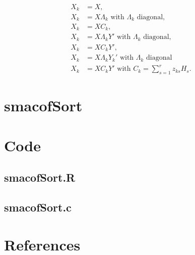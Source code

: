 \documentclass[
  12pt,
]{article}
\newenvironment{Shaded}{\begin{snugshade}}{\end{snugshade}}
\begin{document}
\begin{align}
X_k&=X,\\
X_k&=X\Lambda_k \text{ with }\Lambda_k\text{ diagonal},\\
X_k&=XC_k,\\
X_k&=X\Lambda_k Y' \text{ with }\Lambda_k\text{ diagonal},\\
X_k&=XC_kY',\\
X_k&=X\Lambda_k Y_k'\text{ with }\Lambda_k\text{ diagonal}\\
X_k&=XC_k Y'\text{ with } C_k=\sum_{s=1}^r z_{ks}H_s.
\end{align}

\section{smacofSort}\label{smacofsort}

\section{Code}\label{code}

\subsection{smacofSort.R}\label{smacofsort.r}

\subsection{smacofSort.c}\label{smacofsort.c}

\begin{Shaded}
\begin{Highlighting}[]

\end{Highlighting}
\end{Shaded}

\section*{References}\label{references}
\end{document}
